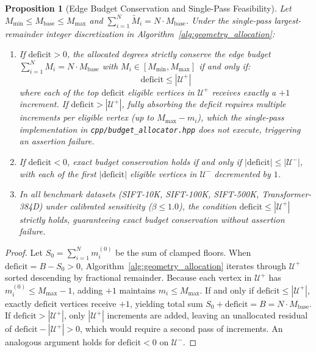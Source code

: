 \documentclass[10pt,journal,compsoc]{IEEEtran}
\newtheorem{proposition}{Proposition}
\begin{document}
\begin{proposition}[Edge Budget Conservation and Single-Pass Feasibility]
\label{prop:conservation}
Let $M_{\min} \le M_{\text{base}} \le M_{\max}$ and $\sum_{i=1}^N \tilde{M}_i = N \cdot M_{\text{base}}$. Under the single-pass largest-remainder integer discretization in Algorithm~\ref{alg:geometry_allocation}:
\begin{enumerate}
    \item If $\text{deficit} > 0$, the allocated degrees strictly conserve the edge budget $\sum_{i=1}^N M_i = N \cdot M_{\text{base}}$ with $M_i \in [M_{\min}, M_{\max}]$ if and only if:
    \begin{equation}
    \text{deficit} \le |\mathcal{U}^+|
    \end{equation}
    where each of the top $\text{deficit}$ eligible vertices in $\mathcal{U}^+$ receives exactly a $+1$ increment. If $\text{deficit} > |\mathcal{U}^+|$, fully absorbing the deficit requires multiple increments per eligible vertex (up to $M_{\max} - m_i$), which the single-pass implementation in \texttt{cpp/budget\_allocator.hpp} does not execute, triggering an assertion failure.
    \item If $\text{deficit} < 0$, exact budget conservation holds if and only if $|\text{deficit}| \le |\mathcal{U}^-|$, with each of the first $|\text{deficit}|$ eligible vertices in $\mathcal{U}^-$ decremented by $1$.
    \item In all benchmark datasets (SIFT-10K, SIFT-100K, SIFT-500K, Transformer-384D) under calibrated sensitivity ($\beta \le 1.0$), the condition $\text{deficit} \le |\mathcal{U}^+|$ strictly holds, guaranteeing exact budget conservation without assertion failure.
\end{enumerate}
\end{proposition}

\begin{proof}
Let $S_0 = \sum_{i=1}^N m_i^{(0)}$ be the sum of clamped floors. When $\text{deficit} = B - S_0 > 0$, Algorithm~\ref{alg:geometry_allocation} iterates through $\mathcal{U}^+$ sorted descending by fractional remainder. Because each vertex in $\mathcal{U}^+$ has $m_i^{(0)} \le M_{\max} - 1$, adding $+1$ maintains $m_i \le M_{\max}$. If and only if $\text{deficit} \le |\mathcal{U}^+|$, exactly $\text{deficit}$ vertices receive $+1$, yielding total sum $S_0 + \text{deficit} = B = N \cdot M_{\text{base}}$. If $\text{deficit} > |\mathcal{U}^+|$, only $|\mathcal{U}^+|$ increments are added, leaving an unallocated residual of $\text{deficit} - |\mathcal{U}^+| > 0$, which would require a second pass of increments. An analogous argument holds for $\text{deficit} < 0$ on $\mathcal{U}^-$.
\end{proof}
\end{document}
